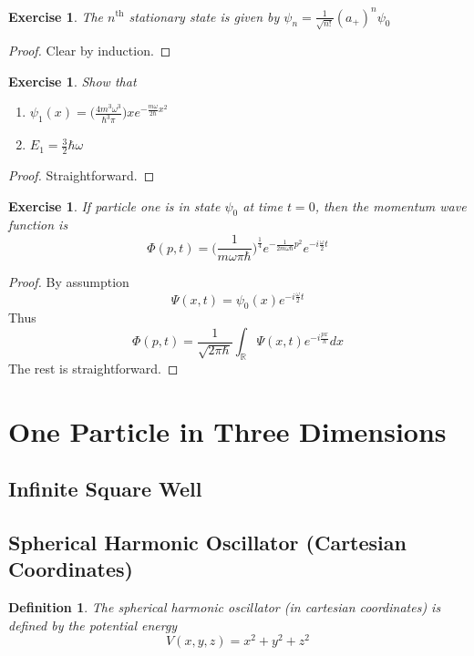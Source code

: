 \documentclass[12pt]{amsart}
\newtheorem{defn}[thm]{Definition}
\newtheorem{ex}[thm]{Exercise}
\newcommand{\om}{\omega}
\newcommand{\R}{\mathbb{R}}
\begin{document}
\begin{ex}
The $n^{\text{th}}$ stationary state is given by $\psi_n = \frac{1}{\sqrt{n!}}(a_+)^n\psi_0$
\end{ex}

\begin{proof}
Clear by induction.
\end{proof}

\begin{ex}
Show that
\begin{enumerate}
\item $\psi_1(x) = \big(\frac{4m^3 \om^3}{\hbar^3 \pi} \big)xe^{-\frac{m \om}{2 \hbar}x^2}$
\item $E_1 = \frac{3}{2} \hbar \om$
\end{enumerate}
\end{ex}

\begin{proof}
Straightforward.
\end{proof}



\begin{ex}
If particle one is in state $\psi_0$ at time $t=0$, then the momentum wave function is $$\Phi(p,t) = \bigg(\frac{1}{m \om \pi \hbar}\bigg)^{\frac{1}{4}}e^{-\frac{1}{2m \om \hbar}p^2}e^{-i \frac{\om}{2}t}$$
\end{ex}

\begin{proof}
By assumption $$\Psi(x,t) = \psi_0(x)e^{-i \frac{\om}{2}t}$$ Thus $$\Phi(p,t) = \frac{1}{\sqrt{2 \pi \hbar}}\int_{\R}\Psi(x,t)e^{-i\frac{px}{h}}dx$$
The rest is straightforward.
\end{proof}
\newpage

\section{One Particle in Three Dimensions}

\subsection{Infinite Square Well}

\subsection{Spherical Harmonic Oscillator (Cartesian Coordinates)}

\begin{defn}
	The spherical harmonic oscillator (in cartesian coordinates) is defined by the potential energy
	$$V(x,y,z) = x^2 + y^2 + z^2$$
\end{defn}
\end{document}

